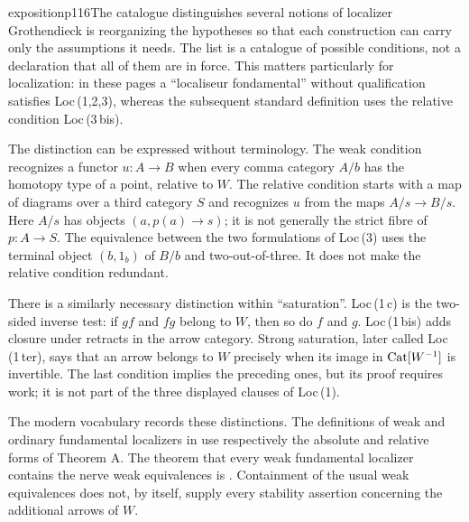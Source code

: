 
\begin{dcomment}{exposition}{p116}{The catalogue distinguishes several notions of localizer}
Grothendieck is reorganizing the hypotheses so that each construction can carry only the assumptions it needs. The list is a catalogue of possible conditions, not a declaration that all of them are in force. This matters particularly for localization: in these pages a ``localiseur fondamental'' without qualification satisfies Loc\,(1,2,3), whereas the subsequent standard definition uses the relative condition Loc\,(3\,bis).

The distinction can be expressed without terminology. The weak condition recognizes a functor $u:A\longrightarrow B$ when every comma category $A/b$ has the homotopy type of a point, relative to $W$. The relative condition starts with a map of diagrams over a third category $S$ and recognizes $u$ from the maps $A/s\longrightarrow B/s$. Here $A/s$ has objects $(a,p(a)\longrightarrow s)$; it is not generally the strict fibre of $p:A\longrightarrow S$. The equivalence between the two formulations of Loc\,(3) uses the terminal object $(b,1_b)$ of $B/b$ and two-out-of-three. It does not make the relative condition redundant.

There is a similarly necessary distinction within ``saturation''. Loc\,(1\,c) is the two-sided inverse test: if $gf$ and $fg$ belong to $W$, then so do $f$ and $g$. Loc\,(1\,bis) adds closure under retracts in the arrow category. Strong saturation, later called Loc\,(1\,ter), says that an arrow belongs to $W$ precisely when its image in $\mathrm{Cat}[W^{-1}]$ is invertible. The last condition implies the preceding ones, but its proof requires work; it is not part of the three displayed clauses of Loc\,(1).

The modern vocabulary records these distinctions. The definitions of weak and ordinary fundamental localizers in \citet[\S\S1.1 and 2.1]{Maltsiniotis2020} use respectively the absolute and relative forms of Theorem A. The theorem that every weak fundamental localizer contains the nerve weak equivalences is \citet[Theorem 6.1.18]{Cisinski2006}. Containment of the usual weak equivalences does not, by itself, supply every stability assertion concerning the additional arrows of $W$.


\end{dcomment}
